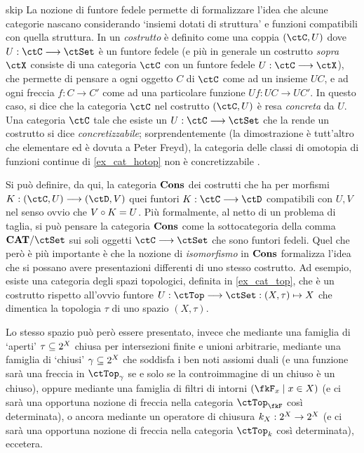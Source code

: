 \begin{hDigression}{skip}\label{def_costrutto}
	La nozione di funtore fedele permette di formalizzare l'idea che alcune categorie nascano considerando `insiemi dotati di struttura' e funzioni compatibili con quella struttura. In \cite[I.5.1]{acc} un \emph{costrutto} è definito come una coppia \((\ctC,U)\) dove \(U : \ctC \fun\ctSet\) è un funtore fedele (e più in generale un costrutto \emph{sopra \(\ctX\)} consiste di una categoria \(\ctC\) con un funtore fedele \(U : \ctC\fun\ctX\)), che permette di pensare a ogni oggetto \(C\) di \(\ctC\) come ad un insieme \(UC\), e ad ogni freccia \(f : C\to C'\) come ad una particolare funzione \(Uf : UC\to UC'\). In questo caso, si dice che la categoria \(\ctC\) nel costrutto \((\ctC,U)\) è resa \emph{concreta} da \(U\). Una categoria \(\ctC\) tale che esiste un \(U : \ctC \fun\ctSet\) che la rende un costrutto si dice \emph{concretizzabile}; sorprendentemente (la dimostrazione è tutt'altro che elementare ed è dovuta a Peter Freyd), la categoria delle classi di omotopia di funzioni continue di \ref{ex_cat_hotop} non è concretizzabile \cite{Freydconc}.

	Si può definire, da qui, la categoria \(\mathbf{Cons}\) dei costrutti che ha per morfismi \(K : (\ctC,U)\fun (\ctD,V)\) quei funtori \(K : \ctC\fun\ctD\) compatibili con \(U,V\) nel senso ovvio che \(V\circ K=U\). Più formalmente, al netto di un problema di taglia, si può pensare la categoria \(\mathbf{Cons}\) come la sottocategoria della comma \(\cate{CAT}/\ctSet\) sui soli oggetti \(\ctC\fun\ctSet\) che sono funtori fedeli. Quel che però è più importante è che la nozione di \emph{isomorfismo} in \(\mathbf{Cons}\) formalizza l'idea che si possano avere presentazioni differenti di uno stesso costrutto. Ad esempio, esiste una categoria degli spazi topologici, definita in \ref{ex_cat_top}, che è un costrutto rispetto all'ovvio funtore \(U : \ctTop\fun\ctSet : (X,\tau)\mapsto X\) che dimentica la topologia \(\tau\) di uno spazio \((X,\tau)\).

	Lo stesso spazio può però essere presentato, invece che mediante una famiglia di `aperti' \(\tau \subseteq 2^{X}\) chiusa per intersezioni finite e unioni arbitrarie, mediante una famiglia di `chiusi' \(\gamma\subseteq 2^{X}\) che soddisfa i ben noti assiomi duali (e una funzione sarà una freccia in \(\ctTop_\gamma\) se e solo se la controimmagine di un chiuso è un chiuso), oppure mediante una famiglia di filtri di intorni \((\fkF_x \mid x\in X)\) (e ci sarà una opportuna nozione di freccia nella categoria \(\ctTop_\fkF\) così determinata), o ancora mediante un operatore di chiusura \(k_X : 2^{X}\to 2^{X}\) (e ci sarà una opportuna nozione di freccia nella categoria \(\ctTop_k\) così determinata), eccetera.


\end{hDigression}
